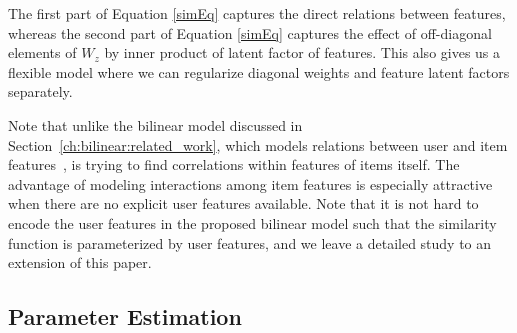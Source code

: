 The first part of Equation \ref{simEq} captures the direct relations between
features, whereas the second part of Equation \ref{simEq} captures the effect of off-diagonal
elements of $W_z$ by inner product of latent factor of features. This also 
gives us a flexible model where we can regularize diagonal weights and feature 
latent factors separately.

Note that unlike the bilinear model discussed in Section~\ref{ch:bilinear:related_work}, which
models relations between user and item features~\cite{chu09www},
\CF is trying to find correlations within features of
items itself. The advantage of modeling interactions among item features is
especially attractive when there are no explicit user features available. Note
that it is not hard to encode the user features in the proposed bilinear model
such that the similarity function is parameterized by user features, and we
leave a detailed study to an extension of this paper.

\subsection{Parameter Estimation}

